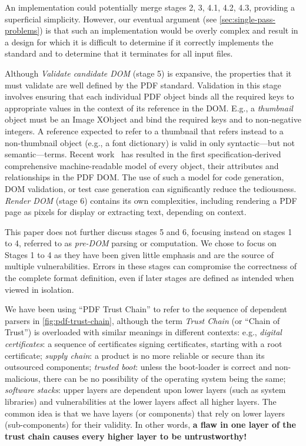 An implementation could potentially merge stages 2, 3, 4.1, 4.2, 4.3,
providing a superficial simplicity.
%
However, our eventual argument (see \cref{sec:single-pass-problems})
is that such an implementation would be overly complex and result in a
design for which it is difficult to determine if it correctly
implements the standard and to determine that it terminates for all
input files.

%
Although \emph{Validate candidate DOM} (stage 5) is expansive, the
properties that it must validate are well defined by the 
PDF standard.
%
Validation in this stage involves ensuring that each individual PDF
object binds all the required keys to appropriate values in the context
of its reference in the DOM.
%
E.g., a \emph{thumbnail} object must be an Image XObject and bind the
required keys  and  to non-negative
integers.
%
A reference expected to refer to a thumbnail that refers instead to a
non-thumbnail object (e.g., a font dictionary) is valid in only
syntactic---but not semantic---terms.
%
Recent work~\cite{peterwyattArlingtonPDFModel2021} has resulted in the
first specification-derived comprehensive machine-readable model of
every object, their attributes and relationships in the PDF DOM. The
use of such a model for code generation, DOM validation, or test case
generation can significantly reduce the tediousness.
%
\emph{Render DOM} (stage 6) contains its own complexities, including
rendering a PDF page as pixels for display or extracting text,
depending on context.

This paper does not further discuss stages 5 and 6, focusing instead
on stages 1 to 4, referred to as \emph{pre-DOM} parsing or
computation.  We chose to focus on Stages 1 to 4 as they have been given
little emphasis and are the source of multiple vulnerabilities.
%
Errors in these stages can compromise the correctness of the complete
format definition, even if later stages are defined as intended when
viewed in isolation.


We have been using ``PDF Trust Chain'' to refer to the sequence of dependent
parsers in \cref{fig:pdf-trust-chain}, although
the term \emph{Trust Chain} (or ``Chain of Trust'') is
overloaded with similar meanings in different contexts:
e.g.,
\emph{digital certificates}: a sequence of certificates signing certificates,
starting with a root certificate;
\emph{supply chain}: a product is no more reliable or secure than its
outsourced components;
\emph{trusted boot}: unless the boot-loader is correct and non-malicious,
there can be no possibility of the operating system being the same;
\emph{software stacks}: upper layers are dependent upon lower layers (such as
system libraries) and vulnerabilities at the lower layers affect all higher
layers.
The common idea is that we have layers (or components) that rely
on lower layers (sub-components) for their validity.  In other words,
{\textbf{a flaw in one layer of the trust chain causes every higher
    layer to be untrustworthy!}}

